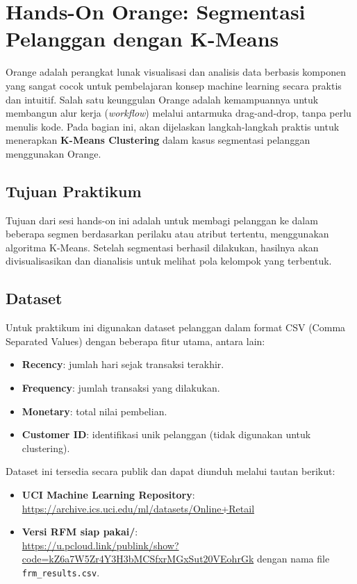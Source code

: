 \section{Hands-On Orange: Segmentasi Pelanggan dengan K-Means}

Orange adalah perangkat lunak visualisasi dan analisis data berbasis komponen yang sangat cocok untuk pembelajaran konsep machine learning secara praktis dan intuitif. Salah satu keunggulan Orange adalah kemampuannya untuk membangun alur kerja (\textit{workflow}) melalui antarmuka drag-and-drop, tanpa perlu menulis kode. Pada bagian ini, akan dijelaskan langkah-langkah praktis untuk menerapkan \textbf{K-Means Clustering} dalam kasus segmentasi pelanggan menggunakan Orange.

\subsection*{Tujuan Praktikum}

Tujuan dari sesi hands-on ini adalah untuk membagi pelanggan ke dalam beberapa segmen berdasarkan perilaku atau atribut tertentu, menggunakan algoritma K-Means. Setelah segmentasi berhasil dilakukan, hasilnya akan divisualisasikan dan dianalisis untuk melihat pola kelompok yang terbentuk.

\subsection*{Dataset}

Untuk praktikum ini digunakan dataset pelanggan dalam format CSV (Comma Separated Values) dengan beberapa fitur utama, antara lain:

\begin{itemize}
	\item \textbf{Recency}: jumlah hari sejak transaksi terakhir.
	\item \textbf{Frequency}: jumlah transaksi yang dilakukan.
	\item \textbf{Monetary}: total nilai pembelian.
	\item \textbf{Customer ID}: identifikasi unik pelanggan (tidak digunakan untuk clustering).
\end{itemize}

Dataset ini tersedia secara publik dan dapat diunduh melalui tautan berikut:

\begin{itemize}
	\item \textbf{UCI Machine Learning Repository}: \url{https://archive.ics.uci.edu/ml/datasets/Online+Retail}
	\item \textbf{Versi RFM siap pakai/}:\\ \url{https://u.pcloud.link/publink/show?code=kZ6a7W5Zr4Y3H3bMCSfxrMGxSut20VEohrGk} dengan nama file \texttt{frm\_results.csv}.
\texttt{}\end{itemize}

